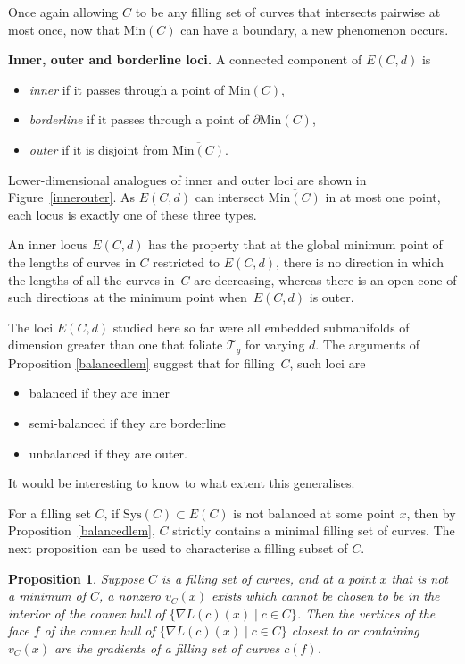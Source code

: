\documentclass[pdftex]{sigma}
\numberwithin{equation}{section}
\newtheorem{Proposition}[Theorem]{Proposition}
\begin{document}
Once again allowing $C$ to be any filling set of curves that intersects pairwise at most once, now that $\mathrm{Min}(C)$ can have a boundary, a new phenomenon occurs.

\textbf{Inner, outer and borderline loci.} A connected component of $E(C,d)$ is
\begin{itemize}\itemsep=0pt
\item\textit{inner} if it passes through a point of $\mathrm{Min}(C)$,
\item\textit{borderline} if it passes through a point of $\partial \mathrm{Min}(C)$,
\item\textit{outer} if it is disjoint from $\overline{\mathrm{Min}(C)}$.
\end{itemize}
Lower-dimensional analogues of inner and outer loci are shown in Figure~\ref{innerouter}. As $E(C,d)$ can intersect $\overline{\mathrm{Min}(C)}$ in at most one point, each locus is exactly one of these three types.

An inner locus $E(C, d)$ has the property that at the global minimum point of the lengths of curves in $C$ restricted to $E(C, d)$, there is no direction in which the lengths of all the curves in~$C$ are decreasing, whereas there is an open cone of such directions at the minimum point when~$E(C, d)$ is outer.

The loci $E(C,d)$ studied here so far were all embedded submanifolds of dimension greater than one that foliate $\mathcal{T}_{g}$ for varying $d$. The arguments of Proposition \ref{balancedlem} suggest that for filling~$C$, such loci are
\begin{itemize}\itemsep=0pt
\item balanced if they are inner
\item semi-balanced if they are borderline
\item unbalanced if they are outer.
\end{itemize}
It would be interesting to know to what extent this generalises.

For a filling set $C$, if $\mathrm{Sys}(C)\subset E(C)$ is not balanced at some point $x$, then by Proposition~\ref{balancedlem}, $C$ strictly contains a minimal filling set of curves. The next proposition can be used to characterise a filling subset of $C$.

\begin{Proposition}
\label{plus1}
Suppose $C$ is a filling set of curves, and at a point $x$ that is not a minimum of $C$, a nonzero $v_{C}(x)$ exists which cannot be chosen to be in the interior of the convex hull of $\{\nabla L(c)(x) \mid c\in C\}$. Then the vertices of the face $f$ of the convex hull of $\{\nabla L(c)(x) \mid c\in C\}$ closest to or containing $v_{C}(x)$ are the gradients of a filling set of curves $c(f)$.
\end{Proposition}
\end{document}
